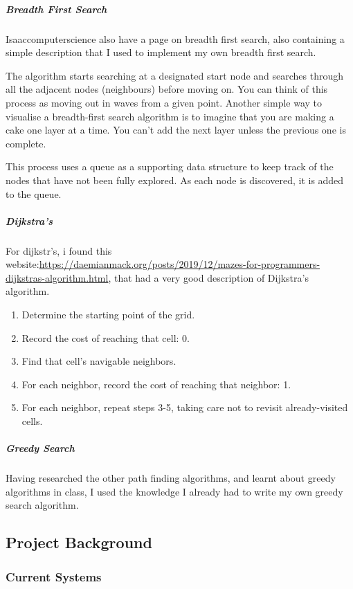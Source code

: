 \documentclass[titlepage]{article}
\begin{document}
\subparagraph*{Breadth First Search}
Isaaccomputerscience also have a page on breadth first search, also containing a simple description that I used to implement my own breadth first search.
\begin{quoting}
    The algorithm starts searching at a designated start node and searches through all the adjacent nodes (neighbours) before moving on. You can think of this process as moving out in waves from a given point. Another simple way to visualise a breadth-first search algorithm is to imagine that you are making a cake one layer at a time. You can't add the next layer unless the previous one is complete.

    This process uses a queue as a supporting data structure to keep track of the nodes that have not been fully explored. As each node is discovered, it is added to the queue.
\end{quoting} 

\subparagraph*{Dijkstra's}
For dijkstr's, i found this website:\url{https://daemianmack.org/posts/2019/12/mazes-for-programmers-dijkstras-algorithm.html}, that had a very good description of Dijkstra's algorithm. 
\begin{quoting}
    \begin{enumerate}
        \item Determine the starting point of the grid.
        \item Record the cost of reaching that cell: 0.
        \item Find that cell's navigable neighbors.
        \item For each neighbor, record the cost of reaching that neighbor: 1.
        \item For each neighbor, repeat steps 3-5, taking care not to revisit already-visited cells.
    \end{enumerate}
\end{quoting}

\subparagraph*{Greedy Search}
Having researched the other path finding algorithms, and learnt about greedy algorithms in class, I used the knowledge I already had to write my own greedy search algorithm.

\subsection{Project Background}
\subsubsection{Current Systems}
\end{document}
